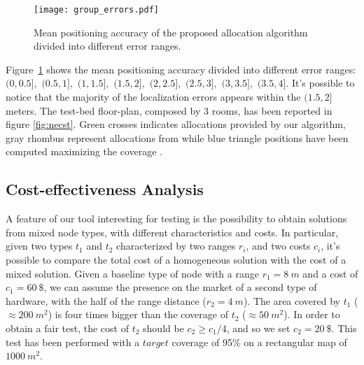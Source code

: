 \begin{figure}[h!tb]
\centering\texttt{[image: group\_errors.pdf]}
\caption{Mean positioning accuracy of the proposed allocation algorithm divided into different error ranges.}
\label{fig:group_errors}
\end{figure}

Figure~\ref{fig:group_errors} shows the mean positioning accuracy divided into different error ranges: $( 0,0.5],$ $(0.5,1],$ $(1,1.5],$ $(1.5,2],$ $(2,2.5],$ $(2.5,3],$ $(3,3.5],$ $(3.5,4]$. It's possible to notice that the majority of the localization errors appears within the $(1.5,2]$ meters.
The test-bed floor-plan, composed by 3 rooms, has been reported in figure \ref{fig:necst}. Green crosses indicates allocations provided by our algorithm, gray rhombus represent allocations from \cite{He2011} while blue triangle positions have been computed maximizing the coverage \cite{Kouakou2010a}.

\subsection{Cost-effectiveness Analysis}
A feature of our tool interesting for testing is the possibility to obtain solutions from mixed node types, with different characteristics and costs. In particular, given two types $t_1$ and $t_2$ characterized by two ranges $r_i$, and two costs $c_i$, it's possible to compare the total cost of a homogeneous solution with the cost of a mixed solution. Given a baseline type of node with a range $r_1=8~m$ and a cost of $c_1=60~\$$, we can assume the presence on the market of a second type of hardware, with the half of the range distance ($r_2=4~m$). The area covered by $t_1$ ($\approx200~m^2$) is four times bigger than the coverage of $t_2$ ($\approx50~m^2$). In order to obtain a fair test, the cost of $t_2$ should be \(c_2 \geq c_1/4\), and so we set $c_2=20~\$$. This test has been performed with a $target$ coverage of 95\% on a rectangular map of $1000~m^2$.

